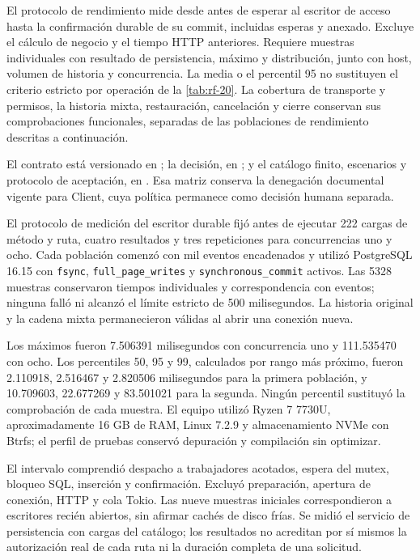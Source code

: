 El protocolo de rendimiento mide desde antes de esperar al escritor de acceso
hasta la confirmación durable de su commit, incluidas esperas y anexado. Excluye
el cálculo de negocio y el tiempo HTTP anteriores. Requiere muestras individuales
con resultado de persistencia, máximo y distribución, junto con host, volumen de
historia y concurrencia. La media o el percentil 95 no sustituyen el criterio
estricto por operación de la \cref{tab:rf-20}. La cobertura de transporte y permisos,
la historia mixta, restauración, cancelación y cierre conservan sus comprobaciones
funcionales, separadas de las poblaciones de rendimiento descritas a continuación.

El contrato está versionado en ; la decisión,
en ; y el catálogo finito,
escenarios y protocolo de aceptación, en .
Esa matriz conserva la denegación documental vigente para Client, cuya política
permanece como decisión humana separada.

El protocolo de medición del escritor durable fijó antes de ejecutar 222 cargas
de método y ruta, cuatro resultados y tres repeticiones para concurrencias uno
y ocho. Cada población comenzó con mil eventos encadenados y utilizó PostgreSQL
16.15 con \texttt{fsync}, \texttt{full\_page\_writes} y
\texttt{synchronous\_commit} activos. Las 5328 muestras conservaron tiempos
individuales y correspondencia con eventos; ninguna falló ni alcanzó el límite
estricto de 500 milisegundos. La historia original y la cadena mixta permanecieron
válidas al abrir una conexión nueva.

Los máximos fueron 7.506391 milisegundos con concurrencia uno y 111.535470 con
ocho. Los percentiles 50, 95 y 99, calculados por rango más próximo, fueron
2.110918, 2.516467 y 2.820506 milisegundos para la primera población, y
10.709603, 22.677269 y 83.501021 para la segunda. Ningún percentil sustituyó la
comprobación de cada muestra. El equipo utilizó Ryzen 7 7730U, aproximadamente
16 GB de RAM, Linux 7.2.9 y almacenamiento NVMe con Btrfs; el perfil de pruebas
conservó depuración y compilación sin optimizar.

El intervalo comprendió despacho a trabajadores acotados, espera del mutex,
bloqueo SQL, inserción y confirmación. Excluyó preparación, apertura de conexión,
HTTP y cola Tokio. Las nueve muestras iniciales correspondieron a escritores
recién abiertos, sin afirmar cachés de disco frías. Se midió el servicio de
persistencia con cargas del catálogo; los resultados no acreditan por sí mismos
la autorización real de cada ruta ni la duración completa de una solicitud.

